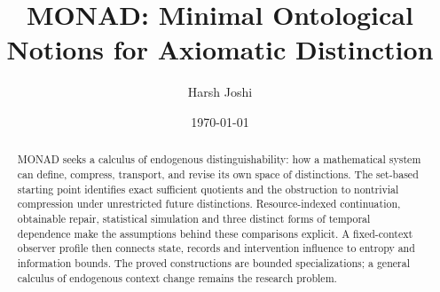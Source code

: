 \documentclass{article}
\title{MONAD: Minimal Ontological Notions for Axiomatic Distinction}
\author{Harsh Joshi}
\date{\today}
\theoremstyle{definition}
\theoremstyle{remark}
\begin{document}
\maketitle

\begin{abstract}
MONAD seeks a calculus of endogenous distinguishability: how a
mathematical system can define, compress, transport, and revise its own
space of distinctions.
The set-based starting point identifies exact sufficient quotients and
the obstruction to nontrivial compression under unrestricted future
distinctions. Resource-indexed continuation, obtainable repair,
statistical simulation and three distinct forms of temporal dependence
make the assumptions behind these comparisons explicit. A fixed-context
observer profile then connects state, records and intervention influence
to entropy and information bounds. The proved constructions are bounded
specializations; a general calculus of endogenous context change remains
the research problem.
\end{abstract}

\tableofcontents
\clearpage

















\end{document}
